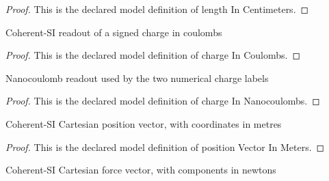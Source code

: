 \begin{proof}
  This is the declared model definition of length In Centimeters.
\end{proof}
\begin{definition}
  \label{def:physics:phyx-mini-0907:phyxminiproblems-problemphyxmini0907-chargeincoulombs}
  Coherent-SI readout of a signed charge in coulombs
\end{definition}
\begin{proof}
  This is the declared model definition of charge In Coulombs.
\end{proof}
\begin{definition}
  \label{def:physics:phyx-mini-0907:phyxminiproblems-problemphyxmini0907-chargeinnanocoulombs}
  Nanocoulomb readout used by the two numerical charge labels
\end{definition}
\begin{proof}
  This is the declared model definition of charge In Nanocoulombs.
\end{proof}
\begin{definition}
  \label{def:physics:phyx-mini-0907:phyxminiproblems-problemphyxmini0907-positionvectorinmeters}
  Coherent-SI Cartesian position vector, with coordinates in metres
\end{definition}
\begin{proof}
  This is the declared model definition of position Vector In Meters.
\end{proof}
\begin{definition}
  \label{def:physics:phyx-mini-0907:phyxminiproblems-problemphyxmini0907-forcevectorinnewtons}
  Coherent-SI Cartesian force vector, with components in newtons
\end{definition}
